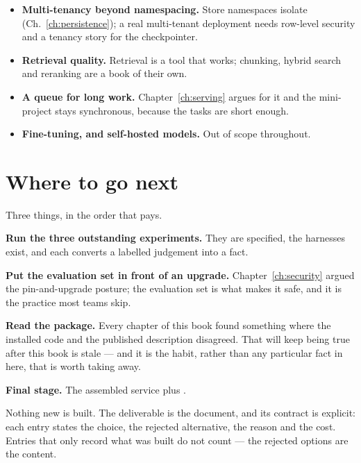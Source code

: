 \begin{itemize}[leftmargin=1.4em]
\item \textbf{Multi-tenancy beyond namespacing.} Store namespaces isolate
      (Ch.~\ref{ch:persistence}); a real multi-tenant deployment needs
      row-level security and a tenancy story for the checkpointer.
\item \textbf{Retrieval quality.} Retrieval is a tool that works; chunking,
      hybrid search and reranking are a book of their own.
\item \textbf{A queue for long work.} Chapter~\ref{ch:serving} argues for it and
      the mini-project stays synchronous, because the tasks are short enough.
\item \textbf{Fine-tuning, and self-hosted models.} Out of scope throughout.
\end{itemize}

\section{Where to go next}
\label{sec:ch17-next}

Three things, in the order that pays.

\textbf{Run the three outstanding experiments.} They are specified, the harnesses
exist, and each converts a labelled judgement into a fact.

\textbf{Put the evaluation set in front of an upgrade.} Chapter~\ref{ch:security}
argued the pin-and-upgrade posture; the evaluation set is what makes it safe, and
it is the practice most teams skip.

\textbf{Read the package.} Every chapter of this book found something where the
installed code and the published description disagreed. That will keep being true
after this book is stale --- and it is the habit, rather than any particular fact
in here, that is worth taking away.

\begin{projectbox}
\textbf{Final stage.} The assembled service plus .

Nothing new is built. The deliverable is the document, and its contract is
explicit: each entry states the choice, the rejected alternative, the reason and
the cost. Entries that only record what was built do not count --- the rejected
options are the content.
\end{projectbox}
